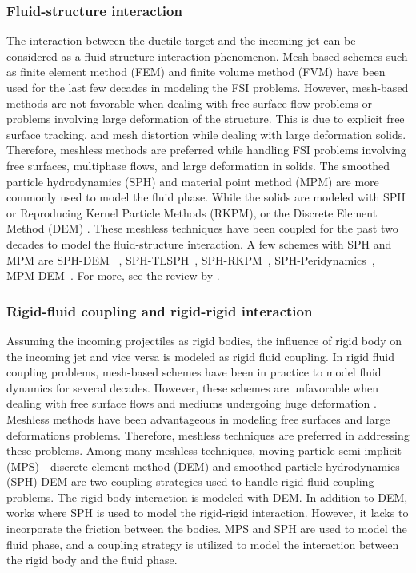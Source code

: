 \subsubsection*{Fluid-structure interaction}
The interaction between the ductile target and the incoming jet can be
considered as a fluid-structure interaction phenomenon. Mesh-based schemes such
as finite element method (FEM) \citep{lozovskiy2015unconditionally} and finite
volume method (FVM) \citep{jasak2007updated} have been used for the last few
decades in modeling the FSI problems. However, mesh-based methods are not
favorable when dealing with free surface flow problems or problems involving
large deformation of the structure. This is due to explicit free surface
tracking, and mesh distortion \citep{moresi2003lagrangian} while dealing with
large deformation solids. Therefore, meshless methods are preferred while
handling FSI problems involving free surfaces, multiphase flows, and large
deformation in solids. The smoothed particle hydrodynamics (SPH) and material
point method (MPM) are more commonly used to model the fluid phase. While the
solids are modeled with SPH or Reproducing Kernel Particle Methods (RKPM), or
the Discrete Element Method (DEM) \citep{hu2010material,li2022material}. These
meshless techniques have been coupled for the past two decades to model the
fluid-structure interaction. A few schemes with SPH and MPM are SPH-DEM~
\citep{wu2016coupled}, SPH-TLSPH~\citep{salehizadeh2022coupled},
SPH-RKPM~\citep{peng2021coupling}, SPH-Peridynamics~\citep{sun2020smoothed},
MPM-DEM~\citep{singer2022partitioned}. For more, see the review by
\citep{khayyer2022systematic}.



\subsubsection*{Rigid-fluid coupling and rigid-rigid interaction}
Assuming the incoming projectiles as rigid bodies, the influence of rigid body
on the incoming jet and vice versa is modeled as rigid fluid coupling. In rigid
fluid coupling problems, mesh-based schemes \citep{dettmer_computational_2006}
have been in practice to model fluid dynamics for several decades. However,
these schemes are unfavorable when dealing with free surface flows and mediums
undergoing huge deformation \citep{walkley_finite_2005}. Meshless methods have
been advantageous in modeling free surfaces and large deformations problems.
Therefore, meshless techniques are preferred in addressing these problems. Among
many meshless techniques, moving particle semi-implicit (MPS) - discrete element
method (DEM) \citep{guo2017numerical} and smoothed particle hydrodynamics
(SPH)-DEM \citep{canelas2016sph} are two coupling strategies used to handle
rigid-fluid coupling problems. The rigid body interaction is modeled with DEM.
In addition to DEM, works where SPH \citep{amicarelli2015smoothed} is used to
model the rigid-rigid interaction. However, it lacks to incorporate the friction
between the bodies. MPS and SPH are used to model the fluid phase, and a
coupling strategy is utilized to model the interaction between the rigid body
and the fluid phase.

